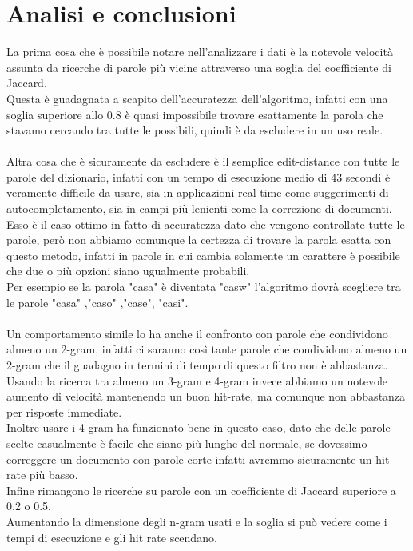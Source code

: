\documentclass[]{article}
\begin{document}
\section{Analisi e conclusioni}
La prima cosa che è possibile notare nell'analizzare i dati è la notevole velocità assunta da ricerche di parole più vicine attraverso una soglia del coefficiente di Jaccard.\\
Questa è guadagnata a scapito dell'accuratezza dell'algoritmo, infatti con una soglia superiore allo 0.8 è quasi impossibile trovare esattamente la parola che stavamo cercando tra tutte le possibili, quindi è da escludere in un uso reale.\\\\
Altra cosa che è sicuramente da escludere è il semplice edit-distance con tutte le parole del dizionario, infatti con un tempo di esecuzione medio di 43 secondi è veramente difficile da usare, sia in applicazioni real time come suggerimenti di autocompletamento, sia in campi più lenienti come la correzione di documenti.\\
Esso è il caso ottimo in fatto di accuratezza dato che vengono controllate tutte le parole, però non abbiamo comunque la certezza di trovare la parola esatta con questo metodo, infatti in parole in cui cambia solamente un carattere è possibile che due o più opzioni siano ugualmente probabili.\\
Per esempio se la parola "casa" è diventata "casw" l'algoritmo dovrà scegliere tra le parole "casa" ,"caso" ,"case", "casi".\\\\
Un comportamento simile lo ha anche il confronto con parole che condividono almeno un 2-gram, infatti ci saranno così tante parole che condividono almeno un 2-gram che il guadagno in termini di tempo di questo filtro non è abbastanza.
Usando la ricerca tra almeno un 3-gram e 4-gram invece abbiamo un notevole aumento di velocità mantenendo un buon hit-rate, ma comunque non abbastanza per risposte immediate.\\
Inoltre usare i 4-gram ha funzionato bene in questo caso, dato che delle parole scelte casualmente è facile che siano più lunghe del normale, se dovessimo correggere un documento con parole corte infatti avremmo sicuramente un hit rate più basso.\\
Infine rimangono le ricerche su parole con un coefficiente di Jaccard superiore a 0.2 o 0.5.\\
Aumentando la dimensione degli n-gram usati e la soglia si può vedere come i tempi di esecuzione e gli hit rate scendano.\\\\
\end{document}
